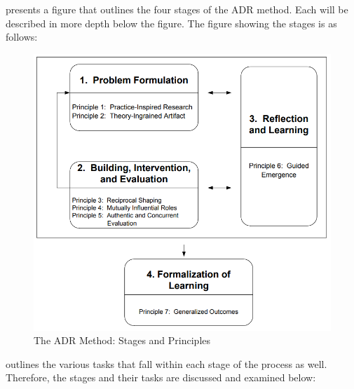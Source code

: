 \par{\cite{sein2011action} presents a figure that outlines the four stages of the ADR method. Each will be described in more depth below the figure. The figure showing the stages is as follows:}
\clearpage
\begin{figure}[h!]
        \centering
        \includegraphics[width=1\linewidth]{img/ADR stages and principles.png}
        \caption{The ADR Method: Stages and Principles}
        \label{fig:enter-label}
    \end{figure}
\par{\cite{sein2011action} outlines the various tasks that fall within each stage of the process as well. Therefore, the stages and their tasks are discussed and examined below:}
